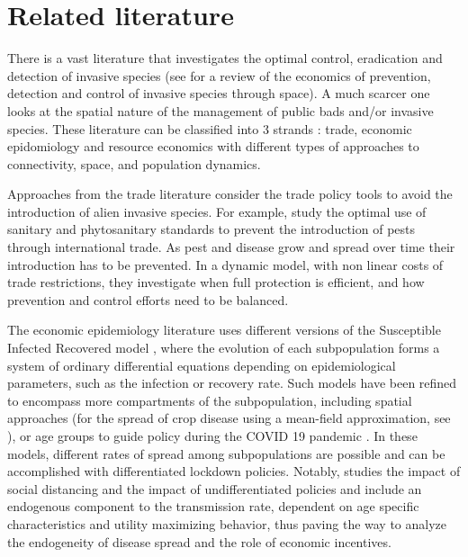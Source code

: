 \section{Related literature}
\label{sec:related_literature}

There is a vast literature that investigates the optimal control, eradication and detection of invasive species (see \cite{epanchin-niell_economics_2017} for a review of the economics of prevention, detection and control of invasive species through space). A much scarcer one looks at the spatial nature of the management of public bads and/or invasive species. These literature can be classified into 3 strands : trade, economic epidomiology and resource economics with different types of approaches to connectivity, space, and population dynamics. 

Approaches from the trade literature consider the trade policy tools to avoid the introduction of alien invasive species. For example, \cite{olson_dynamic_2010} study the optimal use of sanitary and phytosanitary standards to prevent the introduction of pests through international trade. As pest and disease grow and spread over time their introduction has to be prevented. In a dynamic model, with non linear costs of trade restrictions, they investigate when full protection is efficient, and how prevention and control efforts need to be balanced. 

The economic epidemiology literature uses different versions of the Susceptible Infected Recovered model \citep{sir_model}, where the evolution of each subpopulation forms a system of ordinary differential equations depending on epidemiological parameters, such as the infection or recovery rate. Such models have been refined to encompass more compartments of the subpopulation, including spatial approaches (for the spread of crop disease using a mean-field approximation, see \citep{forster_optimizing_2007}), or age groups to guide policy during the COVID 19 pandemic \citep{gollier2020cost, acemoglu_optimal_2021}. In these models, different rates of spread among subpopulations are possible and can be accomplished with differentiated lockdown policies. Notably,  \cite{fenichel_economic_2013} studies the impact of social distancing and the impact of undifferentiated policies and include an endogenous component to the transmission rate, dependent on age specific characteristics and utility maximizing behavior, thus paving the way to analyze the endogeneity of disease spread and the role of economic incentives.

